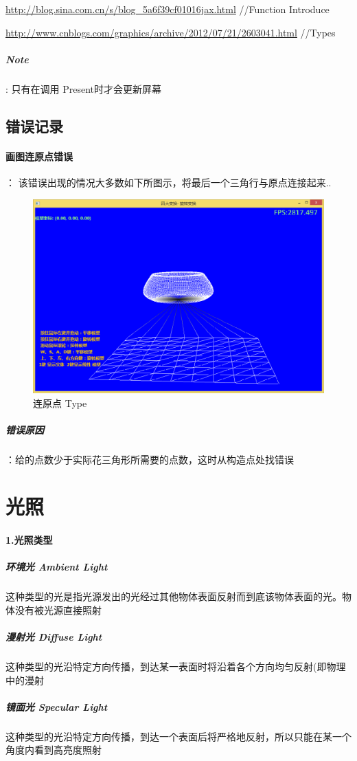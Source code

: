 \documentclass[UTF8,a4paper,8pt]{ctexart}
\begin{document}
			\url{http://blog.sina.com.cn/s/blog_5a6f39cf01016jax.html}  //Function Introduce
		
		    \url{http://www.cnblogs.com/graphics/archive/2012/07/21/2603041.html}   //Types
		    
		    \subparagraph{Note}:
			    只有在调用 Present时才会更新屏幕
			    
	\subsection{错误记录}			   	    
		\paragraph{画图连原点错误}：
				该错误出现的情况大多数如下所图示，将最后一个三角行与原点连接起来..
					\begin{figure}[h]
						\centering
						\includegraphics[angle=0,width=12cm]{Error-Point.png}
						\caption{连原点  Type}
					\end{figure}
				 \subparagraph{错误原因}：给的点数少于实际花三角形所需要的点数，这时从构造点处找错误	
				
\newpage
\section{光照}
	\paragraph{1.光照类型}
		\subparagraph{环境光 Ambient Light}
			这种类型的光是指光源发出的光经过其他物体表面反射而到底该物体表面的光。物体没有被光源直接照射
		\subparagraph{漫射光 Diffuse Light}
			这种类型的光沿特定方向传播，到达某一表面时将沿着各个方向均匀反射(即物理中的漫射
		\subparagraph{镜面光 Specular Light}
			这种类型的光沿特定方向传播，到达一个表面后将严格地反射，所以只能在某一个角度内看到高亮度照射
			
\end{document}
